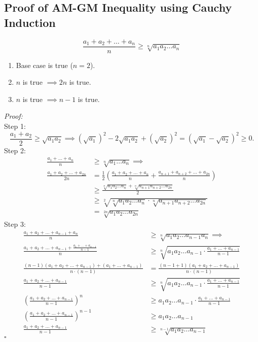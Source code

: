 \documentclass[a4paper,11pt]{article}
\begin{document}
\subsection{Proof of AM-GM Inequality using Cauchy Induction}
\begin{tcolorbox}[breakable]
    \[
    \frac{a_1 + a_2 + \dots + a_n}{n} \geq \sqrt[n]{a_1 a_2 \dots a_n}
    \]
    \begin{enumerate}[label=\roman*.]
        \item Base case is true ($n=2$).
        \item $n$ is true $\implies 2n$ is true.
        \item $n$ is true $\implies n-1$ is true.
    \end{enumerate}
    \emph{Proof:} \\[6pt]
    Step 1:
    \[
    \frac{a_1 + a_2}{2} \geq \sqrt{a_1 a_2} \implies (\sqrt{a_1})^2 - 2\sqrt{a_1 a_2} + (\sqrt{a_2})^2 = (\sqrt{a_1} - \sqrt{a_2})^2 \geq 0.
    \]
    Step 2:
    \begin{align*}
        \frac{a_1 + \dots + a_n}{n} &\geq \sqrt[n]{a_1 \dots a_n} \implies\\
        \frac{a_1 + a_2 + \dots + a_{2n}}{2n} &= \frac{1}{2} \left( \frac{a_1 + a_2 + \dots + a_n}{n} + \frac{a_{n+1} + a_{n+2} + \dots + a_{2n}}{n} \right) \\  
        &\geq \frac{ \sqrt[n]{a_1 a_2 \dots a_n} + \sqrt[n]{a_{n+1} a_{n+2} \dots a_{2n}}}{2} \\
        &\geq \sqrt[2]{\sqrt[n]{a_1 a_2 \dots a_n} \cdot \sqrt[n]{a_{n+1} a_{n+2} \dots a_{2n}}} \\
        &= \sqrt[2n]{a_1 a_2 \dots a_{2n}} 
    \end{align*}
    Step 3:
    \begin{align*}
        \frac{a_1 + a_2 + \dots + a_{n-1} + a_n}{n} &\geq \sqrt[n]{a_1 a_2 \dots a_{n-1} a_n} \implies \\
        \frac{a_1 + a_2 + \dots + a_{n-1} +  \frac{a_1 + \dots + a_{n-1}}{n-1}}{n} &\geq \sqrt[n]{a_1 a_2 \dots a_{n-1} \cdot \frac{a_1 + \dots + a_{n-1}}{n-1}} \\
        \frac{(n-1)(a_1 + a_2 + \dots + a_{n-1}) + (a_1 + \dots + a_{n-1})}{n \cdot (n-1)} &= \frac{(n-1+1)(a_1 + a_2 + \dots + a_{n-1})}{n \cdot (n-1)} \\
        \frac{a_1 + a_2 + \dots + a_{n-1}}{n-1} &\geq \sqrt[n]{a_1 a_2 \dots a_{n-1} \cdot \frac{a_1 + \dots + a_{n-1}}{n-1}} \\
        \left( \frac{a_1 + a_2 + \dots + a_{n-1}}{n-1} \right)^n &\geq a_1 a_2 \dots a_{n-1} \cdot \frac{a_1 + \dots + a_{n-1}}{n-1} \\
        \left( \frac{a_1 + a_2 + \dots + a_{n-1}}{n-1} \right)^{n-1} &\geq a_1 a_2 \dots a_{n-1} \\
        \frac{a_1 + a_2 + \dots + a_{n-1}}{n-1} &\geq \sqrt[n-1]{a_1 a_2 \dots a_{n-1}}
    \end{align*}  
    \hfill$\square$
\end{tcolorbox}
\end{document}
